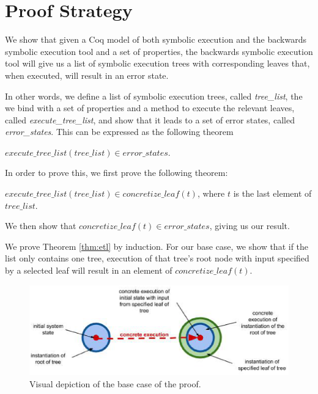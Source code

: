 \section{Proof Strategy}
We show that given a Coq model of both symbolic execution and the backwards symbolic execution tool and a set of properties, 
the backwards symbolic execution tool will give us a list of symbolic execution trees with corresponding leaves that, when executed, will result in an error state.

In other words, we define a list of symbolic execution trees, called \textit{tree\_list}, the we bind with a set of properties and a method to execute the relevant leaves, called \textit{execute\_tree\_list},
and show that it leads to a set of error states, called \textit{error\_states}. This can be expressed as the following theorem


\begin{theorem}
\label{thm:sufficiency}
$execute\_tree\_list (tree\_list) \in error\_states$.
\end{theorem}
 
 In order to prove this, we first prove the following theorem:

\begin{theorem}
\label{thm:etl}
 $execute\_tree\_list (tree\_list) \in concretize\_leaf (t)$, where $t$ is the last element of $tree\_list$.
\end{theorem}

We then show that $concretize\_leaf (t) \in error\_states$, giving us our result.

We prove Theorem \ref{thm:etl} by induction. 
For our base case, we show that if the list only contains one tree, execution of that tree's root node with input specified by a selected leaf will result in an element of $concretize\_leaf (t)$.

\begin{figure}
\centering
\includegraphics[width=.8\textwidth]{set3.eps}
\caption{Visual depiction of the base case of the proof.}
\label{fig:basecase}
\end{figure}


